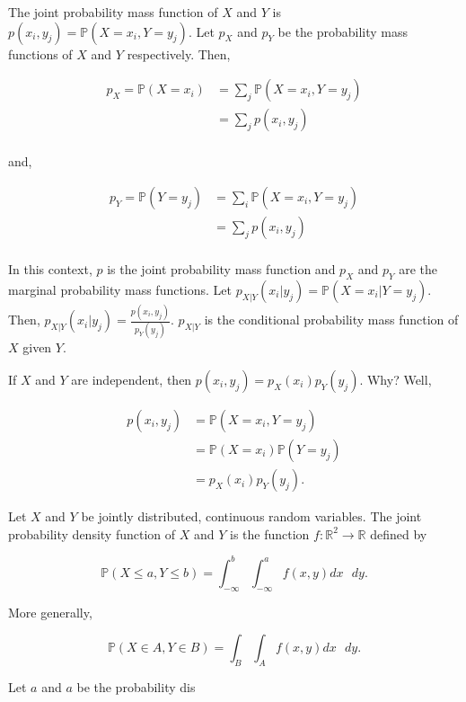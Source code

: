 \documentclass[12pt]{article}
\newcommand{\R}{\mathbb{R}}
\newcommand{\prob}[1]{\mathbb{P}(#1)}
\newcommand{\nspace}{\vspace*{.5cm}}
\newcommand{\nline}{\nspace \noindent}
\begin{document}
\noindent
The joint probability mass function of $X$ and $Y$ is $p(x_i, y_j) = \prob{X = x_i, Y = y_j}$. Let $p_X$ and $p_Y$ be the probability mass functions of $X$ and $Y$ respectively. Then, 

\begin{align*}
p_X = \prob{X = x_i} & = \sum_{j} \prob{X = x_i, Y = y_j} \\
& = \sum_{j} p(x_i, y_j) \\
\end{align*}

\noindent
and, 

\begin{align*}
p_Y = \prob{Y = y_j} & = \sum_{i} \prob{X = x_i, Y = y_j} \\
& = \sum_{j} p(x_i, y_j) \\
\end{align*}

\noindent
In this context, $p$ is the joint probability mass function and $p_X$ and $p_Y$ are the marginal probability mass functions. Let $p_{X \lvert Y} (x_i \lvert y_j) = \prob{X = x_i \lvert Y = y_j}$. Then, $p_{X \lvert Y} (x_i \lvert y_j) = \frac{p(x_i, y_j)}{p_Y (y_j)}$. $p_{X \lvert Y}$ is the conditional probability mass function of $X$ given $Y$.

\nline
If $X$ and $Y$ are independent, then $p(x_i, y_j) = p_X(x_i) p_Y(y_j)$. Why? Well, 

\begin{align*}
p(x_i, y_j) & = \prob{X = x_i, Y = y_j } \\
& = \prob{X = x_i} \prob{Y = y_j} \\
& = p_X(x_i) p_Y(y_j). 
\end{align*}

\nline
Let $X$ and $Y$ be jointly distributed, continuous random variables. The joint probability density function of $X$ and $Y$ is the function $f : \R^2 \rightarrow \R$ defined by

\begin{equation*}
\prob{X \leq a, Y \leq b} = \int_{- \infty}^{b} \int_{- \infty}^{a} f(x, y) dx \text{ } dy.
\end{equation*}

\noindent
More generally, 

\begin{equation*}
\prob{X \in A, Y \in B} = \int_{B} \int_{A} f(x, y) dx \text{ } dy. 
\end{equation*}

\noindent
Let $a$ and $a$ be the probability dis
\end{document}
